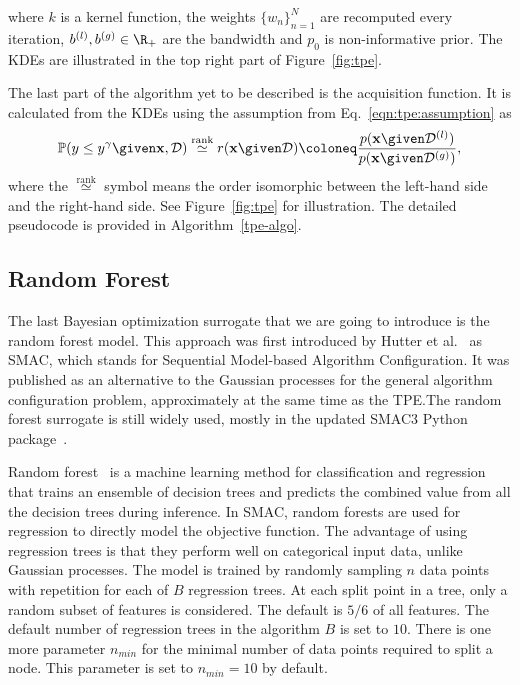 \noindent
where $k$ is a kernel function, the weights $\{ w_n \}_{n=1}^N$ are recomputed every iteration, $b^{(l)},b^{(g)} \in \R_+$ are the bandwidth and $p_0$ is non-informative prior. The KDEs are illustrated in the top right part of Figure~\ref{fig:tpe}.

The last part of the algorithm yet to be described is the acquisition function. It is calculated from the KDEs using the assumption from Eq.~\ref{eqn:tpe:assumption} as
\[
\mathbb{P}(y \leq y^\gamma \given \mathbf{x},\mathcal{D}) \overset{\text{rank}}{\simeq} r(\mathbf{x} \given \mathcal{D}) \coloneq  \frac{p(\mathbf{x} \given \mathcal{D}^{(l)})}{p(\mathbf{x} \given \mathcal{D}^{(g)})} ,
\]
where the $\overset{\text{rank}}{\simeq}$ symbol means the order isomorphic between the left-hand side and the right-hand side. See Figure~\ref{fig:tpe} for illustration. The detailed pseudocode is provided in Algorithm~\ref{tpe-algo}.




\subsection{Random Forest}
The last Bayesian optimization surrogate that we are going to introduce is the random forest model. This approach was first introduced by Hutter et al.~\cite{hutter2010sequential} as SMAC, which stands for Sequential Model-based Algorithm Configuration. It was published as an alternative to the Gaussian processes for the general algorithm configuration problem, approximately at the same time as the TPE.\@ The random forest surrogate is still widely used, mostly in the updated SMAC3 Python package~\cite{smac3}.

Random forest~\cite{breiman2001random} is a machine learning method for classification and regression that trains an ensemble of decision trees and predicts the combined value from all the decision trees during inference. In SMAC, random forests are used for regression to directly model the objective function. The advantage of using regression trees is that they perform well on categorical input data, unlike Gaussian processes. The model is trained by randomly sampling $n$ data points with repetition for each of $B$ regression trees. At each split point in a tree, only a random subset of features is considered. The default is $5/6$ of all features. The default number of regression trees in the algorithm $B$ is set to $10$. There is one more parameter $n_{min}$ for the minimal number of data points required to split a node. This parameter is set to $n_{min}=10$ by default.

